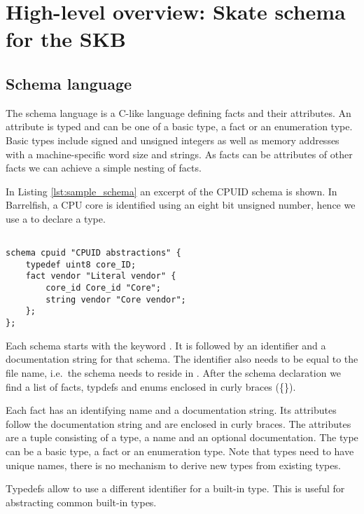 \documentclass[a4paper,11pt,twoside]{report}
\begin{document}
{{\chapter{High-level overview: Skate schema for the SKB}
\label{chap:overview}



\section{Schema language}

The schema language is a C-like language defining facts and their attributes. An
attribute is typed and can be one of a basic type, a fact or an enumeration
type. Basic types include signed and unsigned integers as well as memory
addresses with a machine-specific word size and strings. As facts can be
attributes of other facts we can achieve a simple nesting of facts.

In Listing \ref{lst:sample_schema} an excerpt of the CPUID schema is shown. In
Barrelfish, a CPU core is identified using an eight bit unsigned number, hence
we use a  to declare a  type.

\begin{lstlisting}[caption={Sample Skate schema definition},
label={lst:sample_schema},language=Skate]

schema cpuid "CPUID abstractions" {
    typedef uint8 core_ID;
    fact vendor "Literal vendor" {
        core_id Core_id "Core";
        string vendor "Core vendor";
    };
};
\end{lstlisting}

Each schema starts with the keyword . It is followed by an
identifier and a documentation string for that schema. The identifier also needs
to be equal to the file name, i.e.~the schema  needs to reside in
. After the schema declaration we find a list of facts,
typdefs and enums enclosed in curly braces (\{\}).

Each fact has an identifying name and a documentation string. Its attributes
follow the documentation string and are enclosed in curly braces. The attributes
are a tuple consisting of a type, a name and an optional documentation. The type
can be a basic type, a fact or an enumeration type. Note that types need to have
unique names, there is no mechanism to derive new types from existing types.

Typedefs allow to use a different identifier for a built-in type. This is useful
for abstracting common built-in types.

}}
\end{document}
